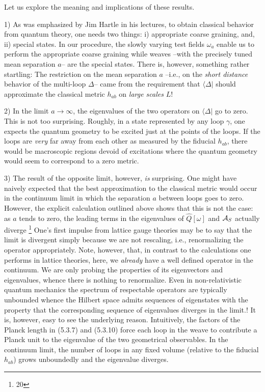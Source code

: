 Let us explore the meaning and implications of these results.
\item{1)} {As was emphasized by Jim Hartle in his lectures, to obtain
classical behavior from quantum theory, one needs two things: i) appropriate
coarse graining, and, ii) special states. In our procedure, the slowly varying
test fields $\omega_a$ enable us to perform the appropriate coarse graining
while weaves --with the precisely tuned mean separation $a$-- are the special
states. There is, however, something rather startling: The restriction on the
mean separation $a$ --i.e., on the {\it short distance} behavior of the
multi-loop $\Delta$-- came from the requirement that $\langle\Delta|$ should
approximate the classical metric $h_{ab}$ on {\it large scales} $L$!}
\item{2)} {In the limit $a\to\infty$, the eigenvalues of the two
operators on $\langle\Delta|$ go to zero. This is not too surprising. Roughly,
in a state represented by any loop $\gamma$, one expects the quantum geometry
to be excited just at the points of the loops. If the loops are {\it very}
far away from each other as measured by the fiducial $h_{ab}$, there would
be macroscopic regions devoid of excitations where the quantum geometry
would seem to correspond to a zero metric.}
\item{3)} {The result of the opposite limit,  however, {\it is} surprising.
One might have naively expected that the best approximation to the classical
metric would occur in the continuum limit in which the separation $a$ between
loops goes to zero. However, the explicit calculation outlined above shows
that this is not the case: as $a$ tends to zero, the leading terms in
the eigenvalues of $\hat{Q}[\omega]$ and ${\cal A}_S$ actually diverge
\footnote{20} {One's first impulse from lattice gauge theories may be to
say that the limit is divergent simply because we are not rescaling, i.e.,
renormalizing the operator appropriately. Note, however, that, in contrast to
the calculations one performs in lattice theories, here, we {\it already}
have a well defined operator in the continuum. We are only probing the
properties of its eigenvectors and eigenvalues, whence there is nothing to
renormalize. Even in non-relativistic quantum mechanics the spectrum of
respectable operators are typically unbounded whence the Hilbert space
admits sequences of eigenstates with the property that the corresponding
sequence of eigenvalues diverges in the limit.}!
It is, however, easy to see the underlying reason. Intuitively, the factors
of the Planck length in (5.3.7) and (5.3.10) force each loop in the weave to
contribute a Planck unit to the eigenvalue of the two geometrical observables.
In the continuum limit, the number of loops in any fixed volume
(relative to the fiducial $h_{ab}$) grows unboundedly and the eigenvalue
diverges.}
